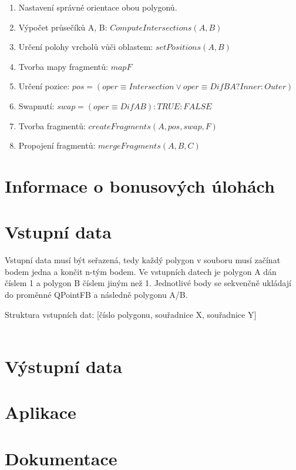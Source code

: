\documentclass[a4paper, 12pt]{article}
\begin{document}
\begin{enumerate}
\item Nastavení správné orientace obou polygonů.
\item Výpočet průsečíků A, B: $ComputeIntersections(A, B)$
\item Určení polohy vrcholů vůči oblastem: $setPositions(A, B) $
\item Tvorba mapy fragmentů: $map F$
\item Určení pozice: $pos = (oper \equiv Intersection \lor oper \equiv DifBA?Inner:Outer ) $
\item Swapnutí: $swap = (oper \equiv DifAB) : TRUE : FALSE$
\item Tvorba fragmentů: $createFragments(A, pos, swap, F)$
\item Propojení fragmentů: $mergeFragments(A, B, C)$
\end{enumerate}



\section{Informace o bonusových úlohách}



\section{Vstupní data}
Vstupní data musí být seřazená, tedy každý polygon v souboru musí začínat bodem jedna a končit n-tým bodem.  Ve vstupních datech je polygon A dán číslem 1 a polygon B číslem jiným než 1. Jednotlivé body se sekvenčně ukládají do proměnné QPointFB a následně polygonu A/B.

Struktura vstupních dat:
[číslo polygonu, souřadnice X, souřadnice Y]\\

\\


\section{Výstupní data}


\clearpage
\section{Aplikace}



\section{Dokumentace}
\end{document}
